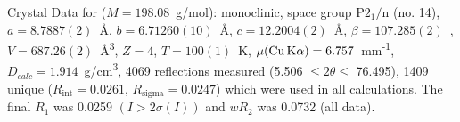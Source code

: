 \documentclass{minimal}
\begin{document}
Crystal Data for  (\(M = 198.08\)~g/mol): monoclinic, space group \(\mathrm{P2_{1}/n}\) (no. 14), \( a = 8.7887(2)\)~\AA{}, \( b = 6.71260(10)\)~\AA{}, \( c = 12.2004(2)\)~\AA{}, \( \beta = 107.285(2)\)~\degree{}, \( V = 687.26(2) \)~\AA{}\textsuperscript{3}, \( Z = 4 \), \( T = 100(1)\)~K, \( \mu ( \ce{Cu K\alpha} ) = 6.757\)~mm\textsuperscript{-1}, \( D_{calc} = 1.914\)~g/cm\textsuperscript{3}, 4069 reflections measured (5.506\degree{} \(\leq 2\theta \leq\) 76.495\degree{}), 1409 unique (\(R_{\mathrm{int}} = 0.0261 \), \(R_{\mathrm{sigma}} = 0.0247 \)) which were used in all calculations. The final \(R_1\) was 0.0259 \( (I > 2\sigma(I)) \) and \(wR_2\) was 0.0732 (all data).
\end{document}
